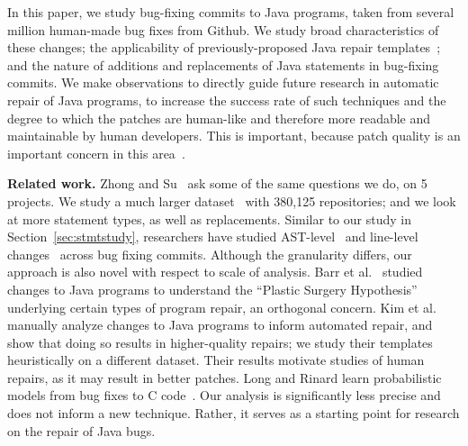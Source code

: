 \documentclass{sig-alternate-05-2015}
\begin{document}
In this paper, we study bug-fixing commits to Java programs, 
taken from several million human-made bug fixes from Github. We study broad
characteristics of these changes; the applicability of previously-proposed
Java repair templates~\cite{kim2013}; and the nature
of additions and replacements of Java statements in bug-fixing commits. We make
observations to directly guide future research in automatic repair of Java
programs, to increase the success rate of such techniques and the degree to
which the patches are human-like and therefore more readable and maintainable by
human developers. This is important, because patch quality is an important
concern in this area~\cite{Qi15}.


\vspace{1ex} \noindent\textbf{Related work.} Zhong and Su~\cite{zhong2015} ask
some of the same questions we do, on  5 projects. We study a much
larger dataset~\cite{dyer2013} with 380,125 repositories; and we look at more
statement types, as well as replacements. Similar to our study in
Section~\ref{sec:stmtstudy}, researchers have 
studied AST-level~\cite{Martinez:2015ez} and line-level
changes~\cite{Asaduzzaman:2013gu} across bug fixing commits.
Although the granularity differs, our approach is also novel with respect to scale of
analysis. Barr et al.~\cite{Barr14fse} studied changes to Java programs to
understand the ``Plastic Surgery Hypothesis'' underlying certain types of
program repair, an orthogonal concern. Kim et al.~\cite{kim2013} manually
analyze changes to Java programs to inform automated repair, and
show that doing so results in higher-quality repairs; we study their templates
heuristically on a different dataset. Their results motivate studies of human
repairs, as it may result in better patches.  Long and Rinard learn
probabilistic models from bug fixes to C code~\cite{Long2016}. Our analysis is
significantly less precise and does not inform a new technique.  Rather, it
serves as a starting point for research on the repair of Java bugs.
\end{document}
